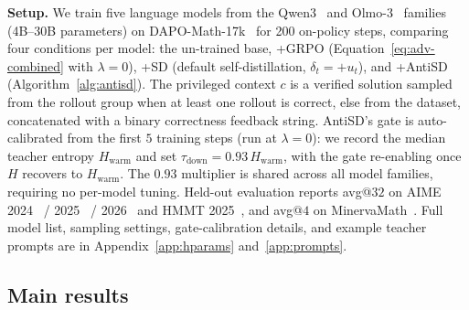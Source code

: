 \documentclass{llmxive}
\begin{document}
\textbf{Setup.} We train five language models from the Qwen3~\citep{yang2025qwen3} and Olmo-3~\citep{olmo2025olmo3} families (4B--30B parameters) on DAPO-Math-17k~\citep{dapo} for 200 on-policy steps, comparing four conditions per model: the un-trained base, +GRPO (Equation~\eqref{eq:adv-combined} with $\lambda=0$), +SD (default self-distillation, $\delta_t = +u_t$), and +AntiSD (Algorithm~\ref{alg:antisd}). The privileged context $c$ is a verified solution sampled from the rollout group when at least one rollout is correct, else from the dataset, concatenated with a binary correctness feedback string. AntiSD's gate is auto-calibrated from the first $5$ training steps (run at $\lambda=0$): we record the median teacher entropy $H_{\mathrm{warm}}$ and set $\tau_{\mathrm{down}} = 0.93\,H_{\mathrm{warm}}$, with the gate re-enabling once $H$ recovers to $H_{\mathrm{warm}}$. The $0.93$ multiplier is shared across all model families, requiring no per-model tuning. Held-out evaluation reports avg@$32$ on AIME 2024~\citep{aime24} / 2025~\citep{aime25} / 2026~\citep{aime26} and HMMT 2025~\citep{dekoninck2026matharena}, and avg@$4$ on MinervaMath~\citep{lewkowycz2022solving}. Full model list, sampling settings, gate-calibration details, and example teacher prompts are in Appendix~\ref{app:hparams} and~\ref{app:prompts}.

\subsection{Main results}
\label{sec:exp:main}
\vspace{-0.5em}
\end{document}
